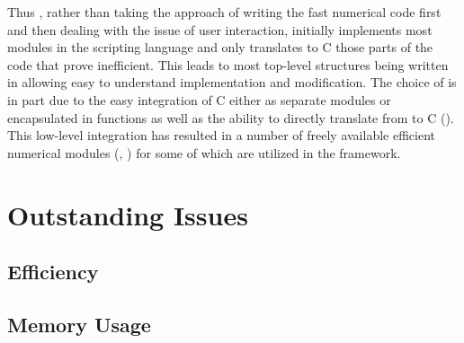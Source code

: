 Thus \FiPy{}, rather than taking the approach of writing the fast
numerical code first and then dealing with the issue of user
interaction, initially implements most modules in the \Python{}
scripting language and only translates to C those parts of the code
that prove inefficient. This leads to most top-level structures being
written in \Python{} allowing easy to understand implementation and
modification. The choice of \Python{} is in part due to the easy
integration of C either as separate modules or encapsulated in
\Python{} functions as well as the ability to directly translate from
\Python{} to C (\PyRex{}). This low-level integration has resulted
in a number of freely available efficient numerical modules (\SciPy{},
\Numeric{}) for \Python{} some of which are utilized in the \FiPy{}
framework.

\section{Outstanding Issues}

\subsection{Efficiency}

\subsection{Memory Usage}